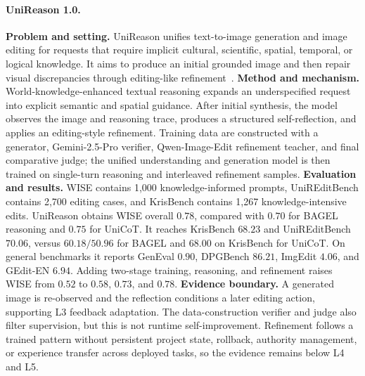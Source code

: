 \paragraph{UniReason 1.0.}
\textbf{Problem and setting.} UniReason unifies text-to-image generation and image editing for requests that require implicit cultural, scientific, spatial, temporal, or logical knowledge. It aims to produce an initial grounded image and then repair visual discrepancies through editing-like refinement~\cite{avg260202437}. \textbf{Method and mechanism.} World-knowledge-enhanced textual reasoning expands an underspecified request into explicit semantic and spatial guidance. After initial synthesis, the model observes the image and reasoning trace, produces a structured self-reflection, and applies an editing-style refinement. Training data are constructed with a generator, Gemini-2.5-Pro verifier, Qwen-Image-Edit refinement teacher, and final comparative judge; the unified understanding and generation model is then trained on single-turn reasoning and interleaved refinement samples. \textbf{Evaluation and results.} WISE contains 1,000 knowledge-informed prompts, UniREditBench contains 2,700 editing cases, and KrisBench contains 1,267 knowledge-intensive edits. UniReason obtains WISE overall $0.78$, compared with $0.70$ for BAGEL reasoning and $0.75$ for UniCoT. It reaches KrisBench $68.23$ and UniREditBench $70.06$, versus $60.18/50.96$ for BAGEL and $68.00$ on KrisBench for UniCoT. On general benchmarks it reports GenEval $0.90$, DPGBench $86.21$, ImgEdit $4.06$, and GEdit-EN $6.94$. Adding two-stage training, reasoning, and refinement raises WISE from $0.52$ to $0.58$, $0.73$, and $0.78$. \textbf{Evidence boundary.} A generated image is re-observed and the reflection conditions a later editing action, supporting L3 feedback adaptation. The data-construction verifier and judge also filter supervision, but this is not runtime self-improvement. Refinement follows a trained pattern without persistent project state, rollback, authority management, or experience transfer across deployed tasks, so the evidence remains below L4 and L5.

